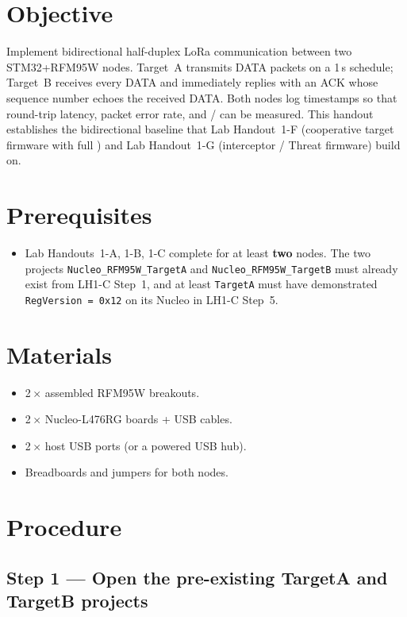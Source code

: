 \documentclass[11pt,letterpaper]{article}
\begin{document}

\section{Objective}
Implement bidirectional half-duplex LoRa communication between two STM32+RFM95W nodes. Target~A transmits DATA packets on a 1\,s schedule; Target~B receives every DATA and immediately replies with an ACK whose sequence number echoes the received DATA. Both nodes log timestamps so that round-trip latency, packet error rate, and \RSSI{}/\SNR{} can be measured. This handout establishes the bidirectional baseline that Lab Handout~1-F (cooperative target firmware with full \FSM{}) and Lab Handout~1-G (interceptor / Threat firmware) build on.

\section{Prerequisites}
\begin{itemize}[leftmargin=2em]
	\item Lab Handouts~1-A, 1-B, 1-C complete for at least \textbf{two} nodes. The two projects \texttt{Nucleo\_RFM95W\_TargetA} and \texttt{Nucleo\_RFM95W\_TargetB} must already exist from LH1-C Step~1, and at least \texttt{TargetA} must have demonstrated \texttt{RegVersion = 0x12} on its Nucleo in LH1-C Step~5.
\end{itemize}

\section{Materials}
\begin{itemize}[leftmargin=2em]
	\item 2\,$\times$ assembled RFM95W breakouts.
	\item 2\,$\times$ Nucleo-L476RG boards + USB cables.
	\item 2\,$\times$ host USB ports (or a powered USB hub).
	\item Breadboards and jumpers for both nodes.
\end{itemize}

\newpage
\section{Procedure}

\subsection{Step 1 --- Open the pre-existing TargetA and TargetB projects}
\end{document}
